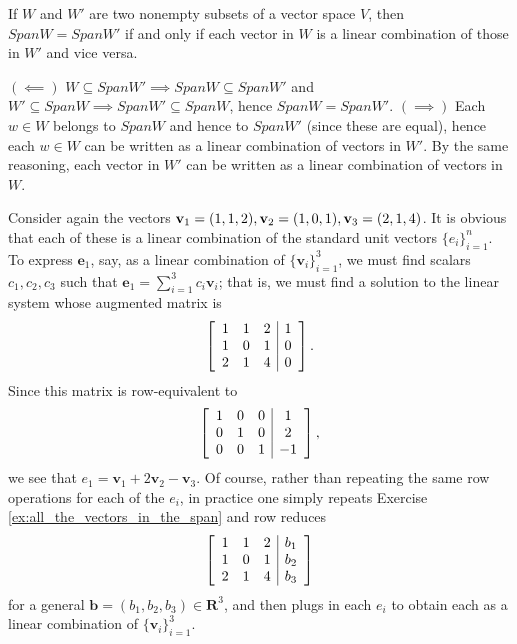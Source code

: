 \documentclass[12pt,letterpaper,reqno]{article}
\numberwithin{equation}{section}
\begin{document}
\begin{thm}
	If $W$ and $W'$ are two nonempty subsets of a vector space $V$, then $SpanW=SpanW'$ if and only if each vector in $W$ is a linear combination of those in $W'$ and vice versa.
\end{thm}

\begin{pf}
$(\impliedby)$ $W \subseteq Span W' \implies Span W \subseteq Span W'$ and $W' \subseteq Span W \implies Span W' \subseteq Span W$, hence $Span W = SpanW'$. $(\implies)$ Each $w \in W$ belongs to $Span W$ and hence to $SpanW'$ (since these are equal), hence each $w \in W$ can be written as a linear combination of vectors in $W'$. By the same reasoning, each vector in $W'$ can be written as a linear combination of vectors in $W$.	
\end{pf}

\begin{example}\label{ex:a_different_spanning_set_for_r_3}
Consider again the vectors ${\bf v}_1=(1,1,2), {\bf v}_2=(1,0,1), {\bf v}_3=(2,1,4)$. It is obvious that each of these is a linear combination of the standard unit vectors $\{e_i\}_{i=1}^n$. To express $\mathbf{e}_1$, say, as a linear combination of $\{\mathbf{v}_i\}_{i=1}^3$, we must find scalars $c_1,c_2,c_3$ such that $\mathbf{e}_1=\sum_{i=1}^3c_i\mathbf{v}_i$; that is, we must find a solution to the linear system whose augmented matrix is
\begin{align*}
	\left[\begin{array}{c c c| c}
		1 & 1 & 2 & 1 \\
		1 & 0 & 1 & 0 \\
		2 & 1 & 4 & 0
	\end{array}\right].
\end{align*}
Since this matrix is row-equivalent to
\begin{align*}
	\left[\begin{array}{c c c| c}
		1 & 0 & 0 & 1 \\
		0 & 1 & 0 & 2 \\
		0 & 0 & 1 & -1
	\end{array}\right],
\end{align*}
we see that $e_1=\mathbf{v}_1+2\mathbf{v}_2-\mathbf{v}_3$. Of course, rather than repeating the same row operations for each of the $e_i$, in practice one simply repeats Exercise \ref{ex:all_the_vectors_in_the_span} and row reduces 
\begin{align*}
	\left[\begin{array}{c c c| c}
		1 & 1 & 2 & b_1 \\
		1 & 0 & 1 & b_2 \\
		2 & 1 & 4 & b_3
	\end{array}\right]
\end{align*}
for a general $\mathbf{b}=(b_1,b_2,b_3) \in \mathbf{R}^3$, and then plugs in each $e_i$ to obtain each as a linear combination of $\{\mathbf{v}_i\}_{i=1}^3$.
\end{example}
\end{document}
